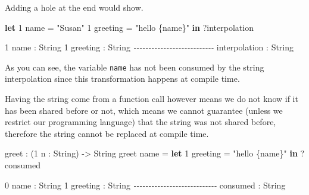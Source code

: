\documentclass[
]{article}
\newenvironment{Shaded}{}{}
\newcommand{\CommentTok}[1]{\textcolor[rgb]{0.38,0.63,0.69}{\textit{#1}}}
\newcommand{\DataTypeTok}[1]{\textcolor[rgb]{0.56,0.13,0.00}{#1}}
\newcommand{\DecValTok}[1]{\textcolor[rgb]{0.25,0.63,0.44}{#1}}
\newcommand{\KeywordTok}[1]{\textcolor[rgb]{0.00,0.44,0.13}{\textbf{#1}}}
\newcommand{\NormalTok}[1]{#1}
\newcommand{\OperatorTok}[1]{\textcolor[rgb]{0.40,0.40,0.40}{#1}}
\newcommand{\OtherTok}[1]{\textcolor[rgb]{0.00,0.44,0.13}{#1}}
\newcommand{\StringTok}[1]{\textcolor[rgb]{0.25,0.44,0.63}{#1}}
\begin{document}
Adding a hole at the end would show.

\begin{Shaded}
\begin{Highlighting}[]
\KeywordTok{let} \DecValTok{1}\NormalTok{ name }\OtherTok{=} \StringTok{"Susan"}
    \DecValTok{1}\NormalTok{ greeting }\OtherTok{=} \StringTok{"hello \{name\}"} \KeywordTok{in}
    \OperatorTok{?}\NormalTok{interpolation}
\end{Highlighting}
\end{Shaded}

\begin{Shaded}
\begin{Highlighting}[]
\DecValTok{1}\NormalTok{ name }\OperatorTok{:} \DataTypeTok{String}
\DecValTok{1}\NormalTok{ greeting }\OperatorTok{:} \DataTypeTok{String}
\CommentTok{{-}{-}{-}{-}{-}{-}{-}{-}{-}{-}{-}{-}{-}{-}{-}{-}{-}{-}{-}{-}{-}{-}{-}{-}{-}{-}{-}}
\NormalTok{interpolation }\OperatorTok{:} \DataTypeTok{String}
\end{Highlighting}
\end{Shaded}

As you can see, the variable \texttt{name} has not been consumed by the
string interpolation since this transformation happens at compile time.

Having the string come from a function call however means we do not know
if it has been shared before or not, which means we cannot guarantee
(unless we restrict our programming language) that the string was not
shared before, therefore the string cannot be replaced at compile time.

\begin{Shaded}
\begin{Highlighting}[]
\NormalTok{greet }\OperatorTok{:}\NormalTok{ (}\DecValTok{1}\NormalTok{ n }\OperatorTok{:} \DataTypeTok{String}\NormalTok{) }\OtherTok{{-}\textgreater{}} \DataTypeTok{String}
\NormalTok{greet name }\OtherTok{=} \KeywordTok{let} \DecValTok{1}\NormalTok{ greeting }\OtherTok{=} \StringTok{"hello \{name\}"} \KeywordTok{in} \OperatorTok{?}\NormalTok{consumed}
\end{Highlighting}
\end{Shaded}

\begin{Shaded}
\begin{Highlighting}[]
\DecValTok{0}\NormalTok{ name }\OperatorTok{:} \DataTypeTok{String}
\DecValTok{1}\NormalTok{ greeting }\OperatorTok{:} \DataTypeTok{String}
\CommentTok{{-}{-}{-}{-}{-}{-}{-}{-}{-}{-}{-}{-}{-}{-}{-}{-}{-}{-}{-}{-}{-}{-}{-}{-}{-}{-}{-}{-}}
\NormalTok{consumed }\OperatorTok{:} \DataTypeTok{String}
\end{Highlighting}
\end{Shaded}
\end{document}
